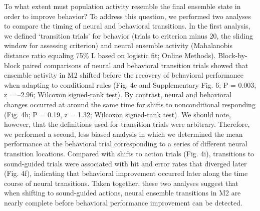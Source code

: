 To what extent must population activity resemble the final ensemble state in order to improve behavior? To address this question, we performed two analyses to compare the timing of neural and behavioral transitions. In the first analysis, we defined `transition trials' for behavior (trials to criterion minus 20, the sliding window for assessing criterion) and neural ensemble activity (Mahalanobis distance ratio equaling 75\% L based on logistic fit; Online Methods). Block-by-block paired comparisons of neural and behavioral transition trials showed that ensemble activity in M2 shifted before the recovery of behavioral performance when adapting to conditional rules (Fig. 4e and Supplementary Fig. 6; P = 0.003, z = –2.96; Wilcoxon signed-rank test). By contrast, neural and behavioral changes occurred at around the same time for shifts to nonconditional responding (Fig. 4h; P = 0.19, z = 1.32; Wilcoxon signed-rank test). We should note, however, that the definitions used for transition trials were arbitrary. Therefore, we performed a second, less biased analysis in which we determined the mean performance at the behavioral trial corresponding to a series of different neural transition locations. Compared with shifts to action trials (Fig. 4i), transitions to sound-guided trials were associated with hit and error rates that diverged later (Fig. 4f), indicating that behavioral improvement occurred later along the time course of neural transitions. Taken together, these two analyses suggest that when shifting to sound-guided actions, neural ensemble transitions in M2 are nearly complete before behavioral performance improvement can be detected.

